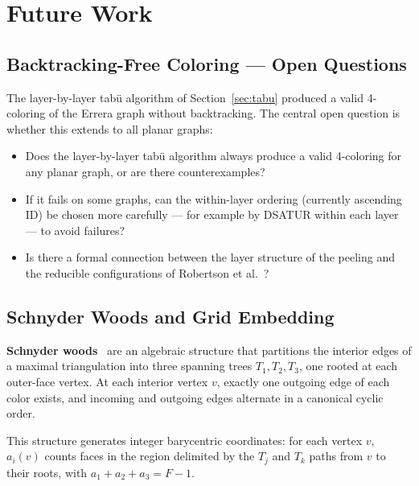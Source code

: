 \documentclass[12pt,letterpaper]{article}
\theoremstyle{plain}
\theoremstyle{definition}
\theoremstyle{remark}
\begin{document}
\section{Future Work}
\label{sec:future}

\subsection{Backtracking-Free Coloring --- Open Questions}

The layer-by-layer tab\"{u} algorithm of Section~\ref{sec:tabu} produced a valid
4-coloring of the Errera graph without backtracking. The central open question
is whether this extends to all planar graphs:

\begin{itemize}[noitemsep]
    \item Does the layer-by-layer tab\"{u} algorithm always produce a valid
        4-coloring for any planar graph, or are there counterexamples?
    \item If it fails on some graphs, can the within-layer ordering (currently
        ascending ID) be chosen more carefully --- for example by DSATUR within
        each layer --- to avoid failures?
    \item Is there a formal connection between the layer structure of the peeling
        and the reducible configurations of Robertson et al.~\cite{robertson1997}?
\end{itemize}

\subsection{Schnyder Woods and Grid Embedding}

\textbf{Schnyder woods}~\cite{schnyder1990} are an algebraic structure that
partitions the interior edges of a maximal triangulation into three spanning
trees $T_1, T_2, T_3$, one rooted at each outer-face vertex. At each interior
vertex $v$, exactly one outgoing edge of each color exists, and incoming and
outgoing edges alternate in a canonical cyclic order.

This structure generates integer barycentric coordinates: for each vertex $v$,
$a_i(v)$ counts faces in the region delimited by the $T_j$ and $T_k$ paths from
$v$ to their roots, with $a_1 + a_2 + a_3 = F - 1$.
\end{document}

